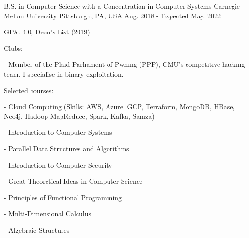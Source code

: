 

\begin{cventries}

  \cventry
    {B.S. in Computer Science with a Concentration in Computer Systems} %
    {Carnegie Mellon University} %
    {Pittsburgh, PA, USA} %
    {Aug. 2018 - Expected May. 2022} %
    {
      \begin{cvitems} %
      \item {GPA: 4.0, Dean's List (2019)}
      \item {Clubs:}
      \item[-] {Member of the Plaid Parliament of Pwning (PPP), CMU's competitive hacking team. I specialise in binary exploitation.}
      \item {Selected courses:}
      \item[-] {Cloud Computing (Skills: AWS, Azure, GCP, Terraform, MongoDB, HBase, Neo4j, Hadoop MapReduce, Spark, Kafka, Samza)}
        \setlength\multicolsep{0pt}
        \begin{multicols}{2}
          \item[-] {Introduction to Computer Systems}
          \item[-] {Parallel Data Structures and Algorithms}
          \item[-] {Introduction to Computer Security}
          \item[-] {Great Theoretical Ideas in Computer Science}
          \item[-] {Principles of Functional Programming}
          \item[-] {Multi-Dimensional Calculus}
          \item[-] {Algebraic Structures}
        \end{multicols}
      \end{cvitems}
    }
\end{cventries}
